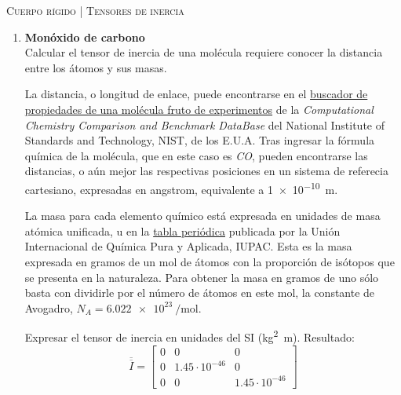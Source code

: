 \documentclass[11pt, spanish, a4paper, twoside]{article}
\begin{document}
\begin{center}
  \textsc{\large Cuerpo rígido | Tensores de inercia}
\end{center}


\begin{enumerate}
	\item
	\textbf{Monóxido de carbono}\\
	Calcular el tensor de inercia de una molécula requiere conocer la distancia entre los átomos y sus masas.

	La distancia, o longitud de enlace, puede encontrarse en el \href{https://cccbdb.nist.gov/exp1x.asp}{buscador de propiedades de una molécula fruto de experimentos} de la \emph{Computational Chemistry Comparison and Benchmark DataBase} del National Institute of Standards and Technology, NIST, de los E.U.A.
	Tras ingresar la fórmula química de la molécula, que en este caso es \emph{CO}, pueden encontrarse las distancias, o aún mejor las respectivas posiciones en un sistema de referecia cartesiano, expresadas en \si{angstrom}, equivalente a \SI{1e-10}{\metre}.

	La masa para cada elemento químico está expresada en unidades de masa atómica unificada, \si{\atomicmassunit} en la \href{https://iupac.org/what-we-do/periodic-table-of-elements/}{tabla periódica} publicada por la Unión Internacional de Química Pura y Aplicada, IUPAC.
	Esta es la masa expresada en gramos de un mol de átomos con la proporción de isótopos que se presenta en la naturaleza.
	Para obtener la masa en gramos de uno sólo basta con dividirle por el número de átomos en este mol, la constante de Avogadro, \(N_A = \SI{6.022e23}{\per\mole}\).
	
	Expresar el tensor de inercia en unidades del SI (\si{\kilogram \squared \metre}).
	Resultado:\\
	\[
		\overline{\overline{I}} = \left[\begin{matrix}0 & 0 & 0\\0 & 1.45 \cdot 10^{-46} & 0\\0 & 0 & 1.45 \cdot 10^{-46}\end{matrix}\right]
	\]




\end{enumerate}
\end{document}
